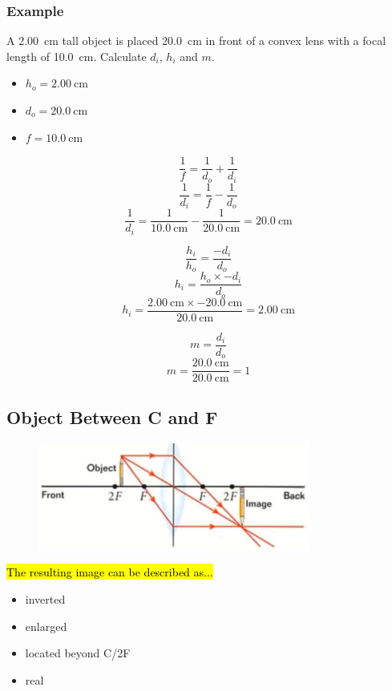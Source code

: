 \documentclass[a4paper,12pt]{article}
\begin{document}
\subsubsection{Example}
A \SI{2.00}{\cm} tall object is placed \SI{20.0}{\cm} in front of a convex lens with a focal length of \SI{10.0}{\cm}. Calculate $d_i$, $h_i$ and $m$.
\begin{itemize}
    \item{$h_o = \SI{2.00}{\cm}$}
    \item{$d_o = \SI{20.0}{\cm}$}
    \item{$f = \SI{10.0}{\cm}$}
\end{itemize}
$$\frac{1}{f} = \frac{1}{d_o} + \frac{1}{d_i}$$
$$\frac{1}{d_i} = \frac{1}{f} - \frac{1}{d_o}$$
$$\frac{1}{d_i} = \frac{1}{\SI{10.0}{\cm}} - \frac{1}{\SI{20.0}{\cm}} = \SI{20.0}{\cm}$$

$$\frac{h_i}{h_o} = \frac{-d_i}{d_o}$$
$$h_i = \frac{h_o \times -d_i}{d_o}$$
$$h_i = \frac{\SI{2.00}{\cm} \times \SI{-20.0}{\cm}}{\SI{20.0}{\cm}} = \SI{2.00}{\cm}$$

$$m = \frac{d_i}{d_o}$$
$$m = \frac{\SI{20.0}{\cm}}{\SI{20.0}{\cm}} = 1$$

\pagebreak
\subsection{Object Between C and F}
\begin{figure}[H]
    \centering
    \includegraphics[width=0.8\textwidth]{convex-betweenCandF}
\end{figure}

\hl{The resulting image can be described as...}
\begin{itemize}
    \item{inverted}
    \item{enlarged}
    \item{located beyond C/2F}
    \item{real}
\end{itemize}

\pagebreak
\end{document}
